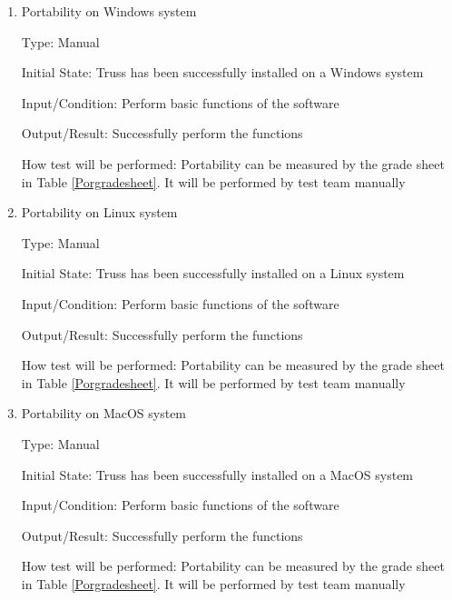 \documentclass[12pt, titlepage]{article}
\begin{document}
\begin{enumerate}
	
	\item{Portability on Windows system\\}
	
	Type: Manual
	
	Initial State: Truss has been successfully installed on a Windows system
	
	Input/Condition: Perform basic functions of the software
	
	Output/Result: Successfully perform the functions
	
	How test will be performed: Portability can be measured by the grade 
	sheet in Table \ref{Porgradesheet}. It will be performed by test team 
	manually
	
	\item{Portability on Linux system\\}
	
	Type: Manual
	
	Initial State: Truss has been successfully installed on a Linux system
	
	Input/Condition: Perform basic functions of the software
	
	Output/Result: Successfully perform the functions
	
	How test will be performed: Portability can be measured by the grade 
	sheet in Table \ref{Porgradesheet}. It will be performed by test team 
	manually
	
		
	\item{Portability on MacOS system\\}
	
	Type: Manual
	
	Initial State: Truss has been successfully installed on a MacOS system
	
	Input/Condition: Perform basic functions of the software
	
	Output/Result: Successfully perform the functions
	
	How test will be performed: Portability can be measured by the grade 
	sheet in Table \ref{Porgradesheet}. It will be performed by test team 
	manually
	

\end{enumerate}
\end{document}
